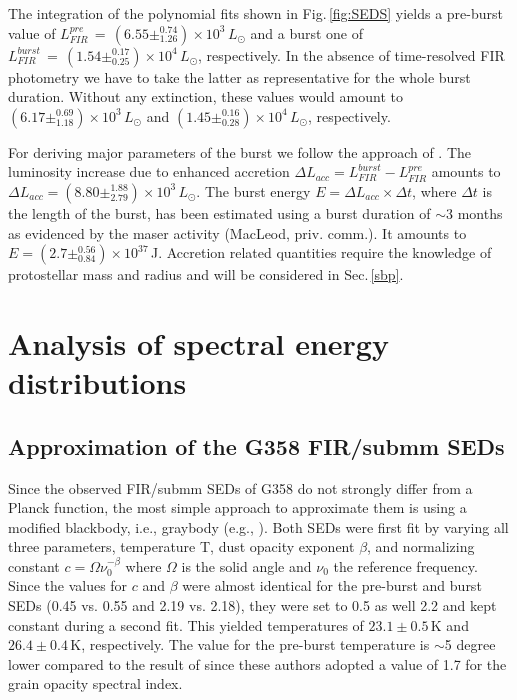 \documentclass[longauth,usenatbib]{aa}
\begin{document}
The integration of the polynomial fits shown in Fig.\,\ref{fig:SEDS} yields a pre-burst value of $L^{pre}_{FIR}\,{=}\,(6.55\pm^{0.74}_{1.26}){\times}10^3\,L_\odot$ and a burst one of $L^{burst}_{FIR}\,{=}\,(1.54\pm^{0.17}_{0.25}){\times}10^4\,L_\odot$, respectively. In the absence of time-resolved FIR photometry we have to take the latter as representative for the whole burst duration. Without any extinction, these values would amount to $(6.17\pm^{0.69}_{1.18}){\times}10^3\,L_\odot$ and $(1.45\pm^{0.16}_{0.28}){\times}10^4\,L_\odot$, respectively.

For deriving major parameters of the burst we follow the approach of . The luminosity increase due to enhanced accretion $\Delta L_{acc}{=}L^{burst}_{FIR}-L^{pre}_{FIR}$ amounts to     $\Delta L_{acc}{=}(8.80\pm^{1.88}_{2.79}){\times}10^3\,L_\odot$.
The burst energy $E{=}\Delta L_{acc} \times \Delta t$, where $\Delta t$ is the length of the burst, has been estimated using
a burst duration of $\sim$3 months as evidenced by the maser activity (MacLeod, priv. comm.). It amounts to $E=(2.7\pm^{0.56}_{0.84}){\times}10^{37}$\,J. Accretion related quantities require the knowledge of protostellar mass and radius and will be considered in Sec.\,\ref{sbp}.

\section{Analysis of spectral energy distributions}\label{ased}

\subsection{Approximation of the G358 FIR/submm SEDs}\label{gb}
Since the observed FIR/submm SEDs of G358 do not strongly differ from a Planck function, the most simple approach to approximate them is using a modified blackbody, i.e., graybody (e.g., ). Both SEDs were  first fit by varying all three parameters, temperature T, dust opacity exponent $\beta$, and normalizing constant $c=\Omega \nu_0^{-\beta}$ where $\Omega$ is the solid angle and $\nu_0$ the reference frequency. Since the values for $c$ and  $\beta$ were almost identical for the pre-burst and burst SEDs (0.45 vs. 0.55 and 2.19 vs. 2.18), they were set to 0.5 as well 2.2 and kept constant during a second fit. This yielded temperatures of $23.1{\pm}0.5\,$K and $26.4\pm0.4\,$K, respectively. The value for the pre-burst temperature is $\sim$5 degree lower compared to the result of  since these authors adopted a value of 1.7 for the grain opacity spectral index. 
\end{document}
